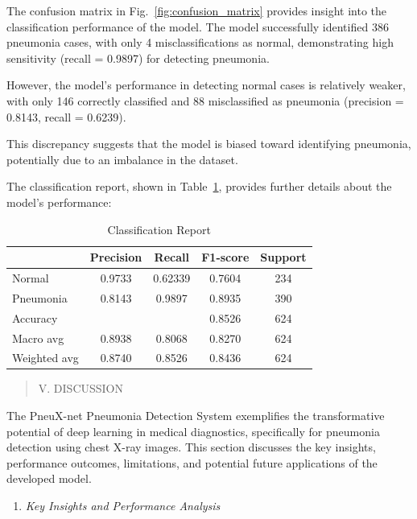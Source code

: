 \documentclass[
  twocolumn,
  10pt,
  a4paper,
  journal
]{IEEEtran}
\begin{document}
The confusion matrix in Fig.~\ref{fig:confusion_matrix} provides insight into the classification performance of the model. The model successfully identified 386 pneumonia cases, with only 4 misclassifications as normal, demonstrating high sensitivity (recall = 0.9897) for detecting pneumonia.

However, the model's performance in detecting normal cases is relatively weaker, with only 146 correctly classified and 88 misclassified as pneumonia (precision = 0.8143, recall = 0.6239).

This discrepancy suggests that the model is biased toward identifying pneumonia, potentially due to an imbalance in the dataset.

The classification report, shown in Table~\ref{tab:classification}, provides further details about the model's performance:

\begin{table}[t]
\centering
\caption{Classification Report}
\label{tab:classification}
\begin{tabular}{lcccc}
\hline
\textbf{} & \textbf{Precision} & \textbf{Recall} & \textbf{F1-score} & \textbf{Support} \\
\hline
Normal & 0.9733 & 0.62339 & 0.7604 & 234 \\
Pneumonia & 0.8143 & 0.9897 & 0.8935 & 390 \\
\hline
Accuracy & & & 0.8526 & 624 \\
Macro avg & 0.8938 & 0.8068 & 0.8270 & 624 \\
Weighted avg & 0.8740 & 0.8526 & 0.8436 & 624 \\
\hline
\end{tabular}
\end{table}

\begin{quote}
V. DISCUSSION
\end{quote}

The PneuX-net Pneumonia Detection System exemplifies the transformative
potential of deep learning in medical diagnostics, specifically for
pneumonia detection using chest X-ray images. This section discusses the
key insights, performance outcomes, limitations, and potential future
applications of the developed model.

\begin{enumerate}
\def\labelenumi{\Alph{enumi}.}
\item
  \emph{Key Insights and Performance Analysis}
\end{enumerate}
\end{document}
